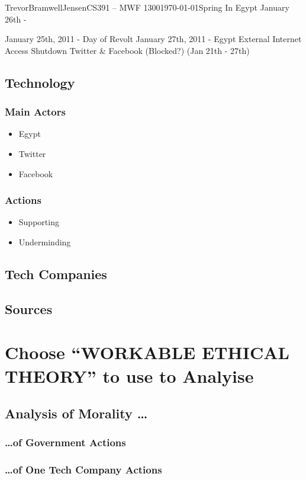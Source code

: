 \documentclass[12pt,letterpaper]{article}
\begin{document}
\begin{mla}{Trevor}{Bramwell}{Jensen}{CS391 -- MWF 1300}{\today}{Spring In Egypt}
January 26th - 

January 25th, 2011 - Day of Revolt
January 27th, 2011 - Egypt External Internet Access Shutdown
Twitter \& Facebook (Blocked?) (Jan 21th - 27th)

\subsection{Technology}
    \subsubsection{Main Actors}
    \begin{itemize}
        \item Egypt
        \item Twitter
        \item Facebook
    \end{itemize}
    \subsubsection{Actions}
    \begin{itemize}
        \item Supporting
        \item Underminding
    \end{itemize}
\subsection{Tech Companies}
\subsection{Sources}

\section{Choose ``WORKABLE ETHICAL THEORY'' to use to Analyise}
    \subsection{Analysis of Morality \ldots}
        \subsubsection{\ldots of Government Actions}
        \subsubsection{\ldots of One Tech Company Actions}

\end{mla}
\end{document}
